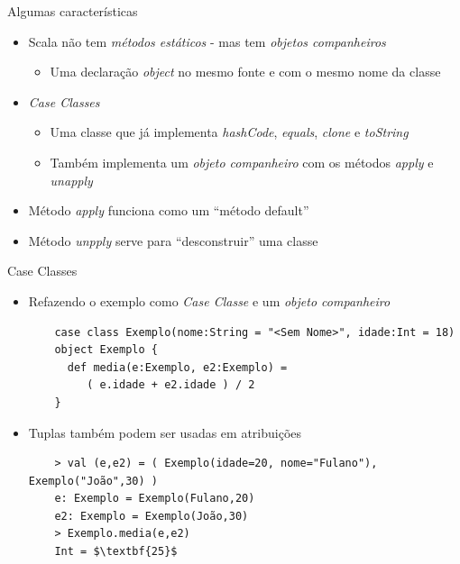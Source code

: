 \documentclass{beamer}
\begin{document}
\begin{frame}[fragile]{Algumas características} 
    \begin{itemize} [<+->]
        \item Scala não tem \emph{métodos estáticos} - mas tem \emph{objetos companheiros}
        \begin{itemize}[<1->]
	\item Uma declaração \emph{object} no mesmo fonte e com o mesmo nome da classe
        \end{itemize}
        \item \emph{Case Classes}
        \begin{itemize}[<2->]
              \item Uma classe que já implementa \emph{hashCode}, \emph{equals}, \emph{clone} e \emph{toString} 
	   \item Também implementa um \emph{objeto companheiro} com os métodos \emph{apply} e \emph{unapply}
        \end{itemize}
        \item<3-> Método \emph{apply} funciona como um ``método default''
        \item<3-> Método \emph{unpply} serve para ``desconstruir'' uma classe
    \end{itemize}
\end{frame}

\begin{frame}[fragile]{Case Classes} 
    \begin{itemize} [<+->]
        \item Refazendo o exemplo como \emph{Case Classe} e um \emph{objeto companheiro}
	\begin{lstlisting}
	case class Exemplo(nome:String = "<Sem Nome>", idade:Int = 18)
	object Exemplo {
	  def media(e:Exemplo, e2:Exemplo) =
	     ( e.idade + e2.idade ) / 2
	}
	\end{lstlisting}
	\item Tuplas também podem ser usadas em atribuições
	\begin{lstlisting}
	> val (e,e2) = ( Exemplo(idade=20, nome="Fulano"), Exemplo("João",30) )
	e: Exemplo = Exemplo(Fulano,20)
	e2: Exemplo = Exemplo(João,30)
	> Exemplo.media(e,e2)
	Int = $\textbf{25}$
	\end{lstlisting}
    \end{itemize}
\end{frame}
\end{document}
